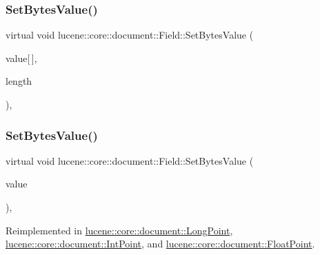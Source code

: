\subsubsection{\texorpdfstring{Set\+Bytes\+Value()}{SetBytesValue()}\hspace{0.1cm}{\footnotesize\ttfamily [1/3]}}
{\footnotesize\ttfamily virtual void lucene\+::core\+::document\+::\+Field\+::\+Set\+Bytes\+Value (\begin{DoxyParamCaption}\item[{\mbox{\hyperlink{ZlibCrc32_8h_a2c212835823e3c54a8ab6d95c652660e}{const}} char}]{value\mbox{[}$\,$\mbox{]},  }\item[{\mbox{\hyperlink{ZlibCrc32_8h_a2c212835823e3c54a8ab6d95c652660e}{const}} uint32\+\_\+t}]{length }\end{DoxyParamCaption})\hspace{0.3cm}{\ttfamily [inline]}, {\ttfamily [virtual]}}

\mbox{\label{classlucene_1_1core_1_1document_1_1Field_a41d077e63ce6fae8677b8df6b29821bd}} 
\subsubsection{\texorpdfstring{Set\+Bytes\+Value()}{SetBytesValue()}\hspace{0.1cm}{\footnotesize\ttfamily [2/3]}}
{\footnotesize\ttfamily virtual void lucene\+::core\+::document\+::\+Field\+::\+Set\+Bytes\+Value (\begin{DoxyParamCaption}\item[{\mbox{\hyperlink{ZlibCrc32_8h_a2c212835823e3c54a8ab6d95c652660e}{const}} \mbox{\hyperlink{classlucene_1_1core_1_1util_1_1BytesRef}{lucene\+::core\+::util\+::\+Bytes\+Ref}} \&}]{value }\end{DoxyParamCaption})\hspace{0.3cm}{\ttfamily [inline]}, {\ttfamily [virtual]}}



Reimplemented in \mbox{\hyperlink{classlucene_1_1core_1_1document_1_1LongPoint_a3ba17f0b827e583a9b568e368dd798ac}{lucene\+::core\+::document\+::\+Long\+Point}}, \mbox{\hyperlink{classlucene_1_1core_1_1document_1_1IntPoint_a288c85e2568bf186de1dac119c91ae2f}{lucene\+::core\+::document\+::\+Int\+Point}}, and \mbox{\hyperlink{classlucene_1_1core_1_1document_1_1FloatPoint_a8862567e2ebfd0b8192eaec0967a943a}{lucene\+::core\+::document\+::\+Float\+Point}}.

